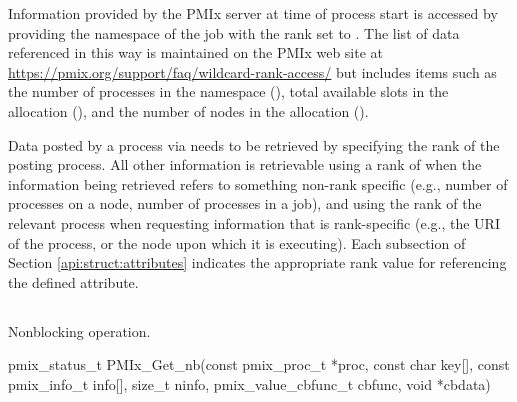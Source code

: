 \adviceuserstart
Information provided by the \ac{PMIx} server at time of process start is accessed by providing the namespace of the job with the rank set to . The list of data referenced in this way is maintained on the \ac{PMIx} web site at \url{https://pmix.org/support/faq/wildcard-rank-access/} but includes items such as the number of processes in the namespace (), total available slots in the allocation (), and the number of nodes in the allocation ().

Data posted by a process via  needs to be retrieved by specifying the rank of the posting process. All other information is retrievable using a rank of  when the information being retrieved refers to something non-rank specific (e.g., number of processes on a node, number of processes in a job), and using the rank of the relevant process when requesting information that is rank-specific (e.g., the \ac{URI} of the process, or the node upon which it is executing). Each subsection of Section \ref{api:struct:attributes} indicates the appropriate rank value for referencing the defined attribute.
\adviceuserend

\subsection{}

\summary

Nonblocking  operation.

\format

\cspecificstart
\begin{codepar}
pmix_status_t
PMIx_Get_nb(const pmix_proc_t *proc, const char key[],
            const pmix_info_t info[], size_t ninfo,
            pmix_value_cbfunc_t cbfunc, void *cbdata)
\end{codepar}
\cspecificend

\begin{arglist}
\end{arglist}

